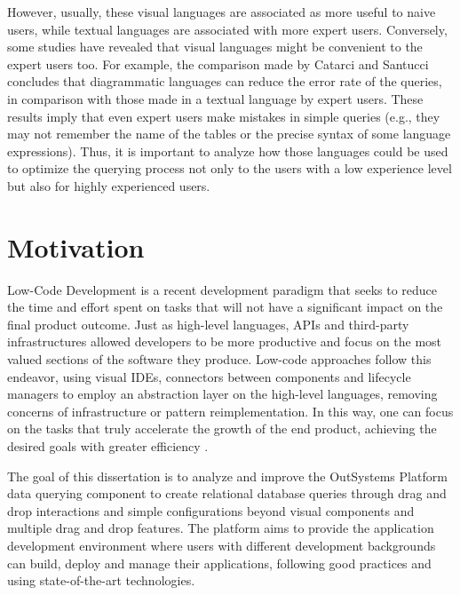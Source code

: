 However, usually, these visual languages are associated as more useful to naive users, while textual languages are associated with more expert users.  Conversely, some studies have revealed that visual languages might be convenient to the expert users too. For example, the comparison made by Catarci and Santucci \cite{diagrammaticVsTextualQueryLanguages_aComparativeExperiment} concludes that diagrammatic languages can reduce the error rate of the queries, in comparison with those made in a textual language by expert users. These results imply that even expert users make mistakes in simple queries (e.g., they may not remember the name of the tables or the precise syntax of some language expressions). Thus, it is important to analyze how those languages could be used to optimize the querying process not only to the users with a low experience level but also for highly experienced users.


\section{Motivation}
\label{sec:motivation}

Low-Code Development is a recent development paradigm that seeks to reduce the time and effort spent on tasks that will not have a significant impact on the final product outcome. Just as high-level languages, APIs and third-party infrastructures allowed developers to be more productive and focus on the most valued sections of the software they produce. Low-code approaches follow this endeavor, using visual \glspl{IDE}, connectors between components and lifecycle managers to employ an abstraction layer on the high-level languages, removing concerns of infrastructure or pattern reimplementation. In this way, one can focus on the tasks that truly accelerate the growth of the end product, achieving the desired goals with greater efficiency \cite{outsystems_whatIsLowCode}.

The goal of this dissertation is to analyze and improve the OutSystems Platform \cite{outsystemsPlatform} data querying component to create relational database queries through drag and drop interactions and simple configurations beyond visual components and multiple drag and drop features. The platform aims to provide the application development environment where users with different development backgrounds can build, deploy and manage their applications, following good practices and using state-of-the-art technologies.

